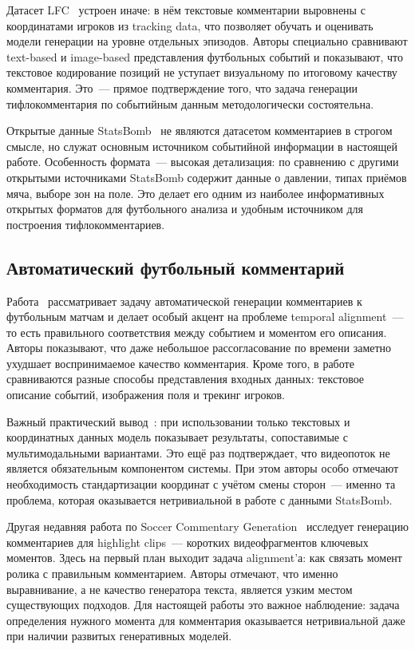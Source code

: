 \documentclass[a4paper,14pt]{extarticle}
\numberwithin{table}{section}
\numberwithin{figure}{section}
\numberwithin{equation}{section}
\begin{document}
Датасет LFC~\cite{lfc2025} устроен иначе: в нём текстовые комментарии выровнены с координатами игроков из tracking data, что позволяет обучать и оценивать модели генерации на уровне отдельных эпизодов. Авторы специально сравнивают text-based и image-based представления футбольных событий и показывают, что текстовое кодирование позиций не уступает визуальному по итоговому качеству комментария. Это~--- прямое подтверждение того, что задача генерации тифлокомментария по событийным данным методологически состоятельна.

Открытые данные StatsBomb~\cite{statsbomb,statsbombschema} не являются датасетом комментариев в строгом смысле, но служат основным источником событийной информации в настоящей работе. Особенность формата~--- высокая детализация: по сравнению с другими открытыми источниками StatsBomb содержит данные о давлении, типах приёмов мяча, выборе зон на поле. Это делает его одним из наиболее информативных открытых форматов для футбольного анализа и удобным источником для построения тифлокомментариев.

\subsection{Автоматический футбольный комментарий}

Работа~\cite{matchtime2024} рассматривает задачу автоматической генерации комментариев к футбольным матчам и делает особый акцент на проблеме temporal alignment~--- то есть правильного соответствия между событием и моментом его описания. Авторы показывают, что даже небольшое рассогласование по времени заметно ухудшает воспринимаемое качество комментария. Кроме того, в работе сравниваются разные способы представления входных данных: текстовое описание событий, изображения поля и трекинг игроков.

Важный практический вывод~\cite{matchtime2024}: при использовании только текстовых и координатных данных модель показывает результаты, сопоставимые с мультимодальными вариантами. Это ещё раз подтверждает, что видеопоток не является обязательным компонентом системы. При этом авторы особо отмечают необходимость стандартизации координат с учётом смены сторон~--- именно та проблема, которая оказывается нетривиальной в работе с данными StatsBomb.

Другая недавняя работа по Soccer Commentary Generation~\cite{matchvoice2025} исследует генерацию комментариев для highlight clips~--- коротких видеофрагментов ключевых моментов. Здесь на первый план выходит задача alignment'а: как связать момент ролика с правильным комментарием. Авторы отмечают, что именно выравнивание, а не качество генератора текста, является узким местом существующих подходов. Для настоящей работы это важное наблюдение: задача определения нужного момента для комментария оказывается нетривиальной даже при наличии развитых генеративных моделей.
\end{document}
